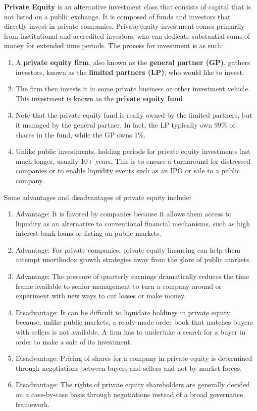 \documentclass{article}
\begin{document}
  \begin{definition}
  \textbf{Private Equity} is an alternative investment class that consists of capital that is not listed on a public exchange. It is composed of funds and investors that directly invest in private companies. Private equity investment comes primarily from institutional and accredited investors, who can dedicate substantial sums of money for extended time periods. The process for investment is as such: 
  \begin{enumerate}
    \item A \textbf{private equity firm}, also known as the \textbf{general partner (GP)}, gathers investors, known as the \textbf{limited partners (LP)}, who would like to invest. 
    \item The firm then invests it in some private business or other investment vehicle. This investment is known as the \textbf{private equity fund}. 
    \item Note that the private equity fund is really owned by the limited partners, but it managed by the general partner. In fact, the LP typically own 99\% of shares in the fund, while the GP owns 1\%. 
    \item Unlike public investments, holding periods for private equity investments last much longer, usually 10+ years. This is to ensure a turnaround for distressed companies or to enable liquidity events such as an IPO or sale to a public company.  
  \end{enumerate}
  Some advantages and disadvantages of private equity include: 
  \begin{enumerate}
    \item Advantage: It is favored by companies because it allows them access to liquidity as an alternative to conventional financial mechanisms, such as high interest bank loans or listing on public markets. 
    \item Advantage: For private companies, private equity financing can help them attempt unorthodox growth strategies away from the glare of public markets. 
    \item Advantage: The pressure of quarterly earnings dramatically reduces the time frame available to senior management to turn a company around or experiment with new ways to cut losses or make money. 
    \item Disadvantage: It can be difficult to liquidate holdings in private equity because, unlike public markets, a ready-made order book that matches buyers with sellers is not available. A firm has to undertake a search for a buyer in order to make a sale of its investment. 
    \item Disadvantage: Pricing of shares for a company in private equity is determined through negotiations between buyers and sellers and not by market forces. 
    \item Disadvantage: The rights of private equity shareholders are generally decided on a case-by-case basis through negotiations instead of a broad governance framework. 
  \end{enumerate}
  \end{definition}
\end{document}
